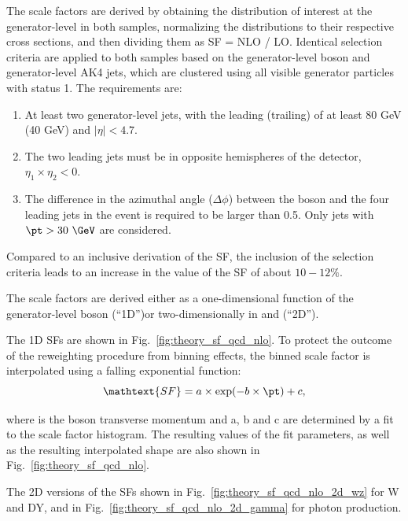 The scale factors are derived by obtaining the distribution of interest at the generator-level in both samples, normalizing the distributions to their respective cross sections, and then dividing them as SF = NLO / LO. Identical selection criteria are applied to both samples based on the generator-level boson and generator-level AK4 jets, which are clustered using all visible generator particles with status 1. The requirements are:

\begin{enumerate}
\item At least two generator-level jets, with the leading (trailing) \pt of at least 80 GeV (40 GeV) and $|\eta|<4.7$.
\item The two leading jets must be in opposite hemispheres of the detector, $\eta_{1}\times \eta_{2}<0$.
\item The difference in the azimuthal angle ($\Delta\phi$) between the boson and the four leading jets in the event is required to be larger than 0.5. Only jets with $\pt>30~\GeV$ are considered.
\end{enumerate}

Compared to an inclusive derivation of the SF, the inclusion of the selection criteria leads to an increase in the value of the SF of about $10-12\%$.


The scale factors are derived either as a one-dimensional function of the generator-level boson \ptv (``1D'')or two-dimensionally in \ptv and \mjj (``2D'').

The 1D SFs are shown in Fig.~\ref{fig:theory_sf_qcd_nlo}. To protect the outcome of the reweighting procedure from binning effects, the binned scale factor is interpolated using a falling exponential function:
\begin{equation}
\mathtext{SF} = a\times \exp(-b\times\pt) + c,
\end{equation}

where \pt is the boson transverse momentum and a, b and c are determined by a fit to the scale factor histogram. The resulting values of the fit parameters, as well as the resulting interpolated shape are also shown in Fig.~\ref{fig:theory_sf_qcd_nlo}.

The 2D versions of the SFs shown in Fig.~\ref{fig:theory_sf_qcd_nlo_2d_wz} for W and DY, and in Fig.~\ref{fig:theory_sf_qcd_nlo_2d_gamma} for photon production.


